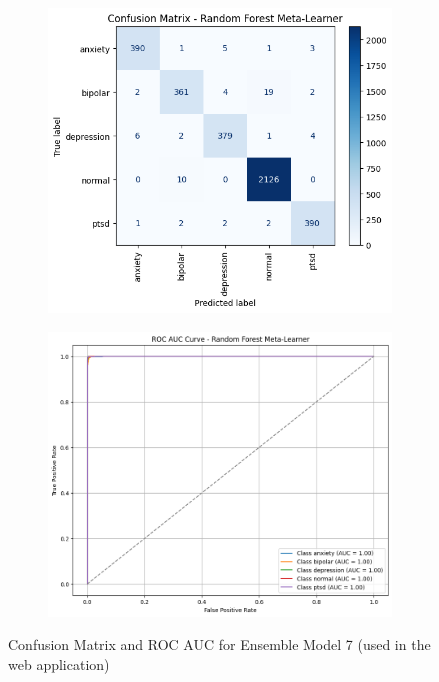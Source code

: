\pagebreak

\begin{figure}[h!]
    \centering
    \begin{subfigure}[b]{0.48\textwidth}
        \centering
        \includegraphics[width=\textwidth]{Images/EM T CM.png}
        \label{em_t cm}  %
    \end{subfigure}
    \hfill
    \begin{subfigure}[b]{0.48\textwidth}
        \centering
        \includegraphics[width=\textwidth]{Images/EM T ROC.png}
        \label{em_t roc}  %
    \end{subfigure}
    \vspace{-0.5cm}
    \caption*{Confusion Matrix and ROC AUC for Ensemble Model 7 (used in the web application)}
    \label{fig:ensemble_model7_comparison}
\end{figure}

